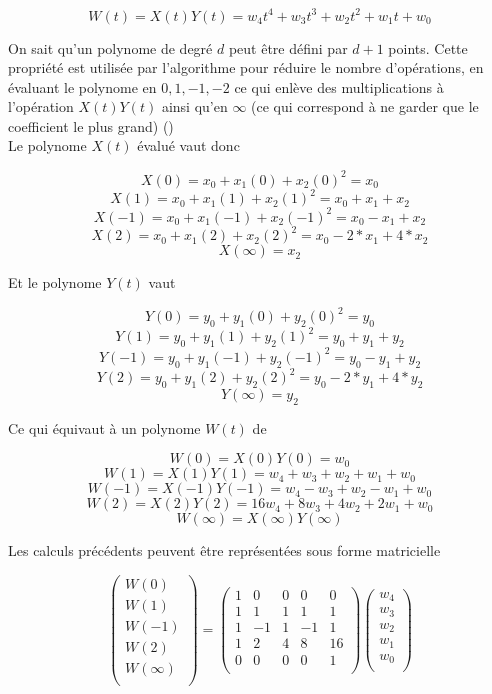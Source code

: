 \documentclass[letterpaper]{article}
\begin{document}
    $$W(t) = X(t) Y(t) =  w_4 t^4 + w_3 t^3 + w_2 t^2 + w_1 t + w_0$$

On sait qu'un polynome de degré $d$ peut être défini par $d + 1$ points. Cette
propriété est utilisée par l'algorithme pour réduire le nombre d'opérations,
en évaluant le polynome en $0, 1, -1, -2$ ce qui enlève des multiplications
à l'opération $X(t) Y(t)$ ainsi qu'en $\infty$ (ce qui correspond à ne garder
que le coefficient le plus grand) (\cite{wikitoom3})\\

Le polynome $X(t)$ évalué vaut donc

    $$X(0) = x_{0} + x_{1} (0) + x_2 {(0)}^{2} = x_{0}$$
    $$X(1) = x_0 + x_1(1) + x_2{(1)}^2 = x_0 + x_1 + x_2$$
    $$X(-1) = x_0 + x_1(-1) + x_2{(-1)}^2 = x_0 - x_1 + x_2$$
    $$X(2) = x_0 + x_1(2) + x_2{(2)}^2 = x_0 - 2 * x_1 + 4 * x_2$$
    $$X(\infty) = x_2$$

Et le polynome $Y(t)$ vaut

    $$Y(0) = y_{0} + y_{1} (0) + y_2 {(0)}^{2} = y_{0}$$
    $$Y(1) = y_0 + y_1(1) + y_2{(1)}^2 = y_0 + y_1 + y_2$$
    $$Y(-1) = y_0 + y_1(-1) + y_2{(-1)}^2 = y_0 - y_1 + y_2$$
    $$Y(2) = y_0 + y_1(2) + y_2{(2)}^2 = y_0 - 2 * y_1 + 4 * y_2$$
    $$Y(\infty) = y_2$$

Ce qui équivaut à un polynome $W(t)$ de

    $$W(0) = X(0)Y(0) = w_0$$
    $$W(1) = X(1)Y(1) = w_4 + w_3 + w_2 + w_1 + w_0$$
    $$W(-1) =X(-1)Y(-1) = w_4 - w_3 + w_2 - w_1 + w_0$$
    $$W(2) = X(2)Y(2) = 16 w_4 + 8 w_3 + 4 w_2 + 2 w_1 + w_0$$
    $$W(\infty) = X(\infty)Y(\infty)$$

Les calculs précédents peuvent être représentées sous forme matricielle

$$
\begin{pmatrix}
  W (0) \\
  W (1) \\
  W (-1) \\
  W (2) \\
  W (\infty) \\
\end{pmatrix}
 =
\begin{pmatrix}
  1 & 0 & 0 & 0 & 0 \\
  1 & 1 & 1 & 1 & 1 \\
  1 &-1 & 1 &-1 & 1 \\
  1 & 2 & 4 & 8 &16 \\
  0 & 0 & 0 & 0 & 1 \\
\end{pmatrix}
\begin{pmatrix}
  w_4 \\
  w_3 \\
  w_2 \\
  w_1 \\
  w_0 \\
\end{pmatrix}
$$
\end{document}

